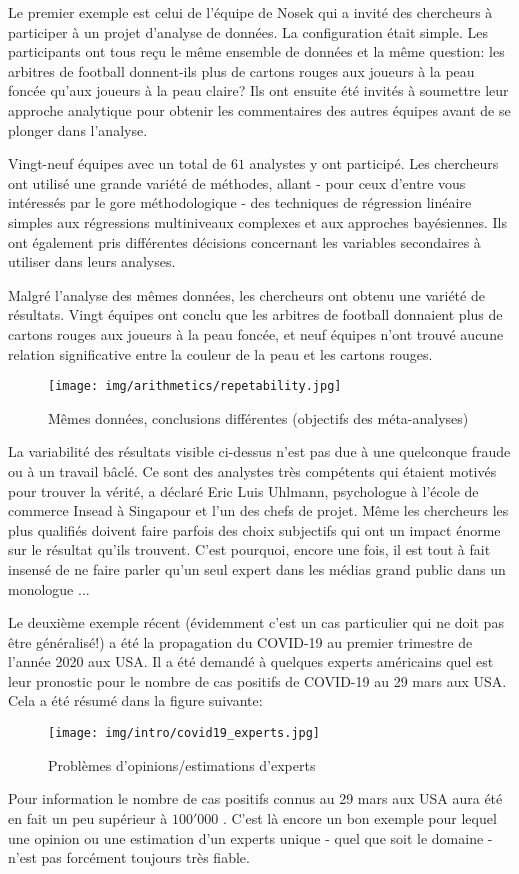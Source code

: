 	Le premier exemple est celui de l'équipe de Nosek qui a invité des chercheurs à participer à un projet d'analyse de données. La configuration était simple. Les participants ont tous reçu le même ensemble de données et la même question: les arbitres de football donnent-ils plus de cartons rouges aux joueurs à la peau foncée qu'aux joueurs à la peau claire? Ils ont ensuite été invités à soumettre leur approche analytique pour obtenir les commentaires des autres équipes avant de se plonger dans l'analyse.
	
	Vingt-neuf équipes avec un total de $61$ analystes y ont participé. Les chercheurs ont utilisé une grande variété de méthodes, allant - pour ceux d'entre vous intéressés par le gore méthodologique - des techniques de régression linéaire simples aux régressions multiniveaux complexes et aux approches bayésiennes. Ils ont également pris différentes décisions concernant les variables secondaires à utiliser dans leurs analyses.

	Malgré l'analyse des mêmes données, les chercheurs ont obtenu une variété de résultats. Vingt équipes ont conclu que les arbitres de football donnaient plus de cartons rouges aux joueurs à la peau foncée, et neuf équipes n'ont trouvé aucune relation significative entre la couleur de la peau et les cartons rouges.
	\begin{figure}[H]
		\centering
		\texttt{[image: img/arithmetics/repetability.jpg]}
		\caption{Mêmes données, conclusions différentes (objectifs des méta-analyses)}
	\end{figure}
	La variabilité des résultats visible ci-dessus n'est pas due à une quelconque fraude ou à un travail bâclé. Ce sont des analystes très compétents qui étaient motivés pour trouver la vérité, a déclaré Eric Luis Uhlmann, psychologue à l'école de commerce Insead à Singapour et l'un des chefs de projet. Même les chercheurs les plus qualifiés doivent faire parfois des choix subjectifs qui ont un impact énorme sur le résultat qu'ils trouvent. C'est pourquoi, encore une fois, il est tout à fait insensé de ne faire parler qu'un seul expert dans les médias grand public dans un monologue ...
	
	Le deuxième exemple récent (évidemment c'est un cas particulier qui ne doit pas être généralisé!) a été la propagation du COVID-19 au premier trimestre de l'année 2020 aux USA. Il a été demandé à quelques experts américains quel est leur pronostic pour le nombre de cas positifs de COVID-19 au 29 mars aux USA. Cela a été résumé dans la figure suivante:
	\begin{figure}[H]
		\centering
		\texttt{[image: img/intro/covid19\_experts.jpg]}
		\caption{Problèmes d'opinions/estimations d'experts}
	\end{figure}
	Pour information le nombre de cas positifs connus au 29 mars aux USA aura été en fait un peu supérieur à $100'000$ . C'est là encore un bon exemple pour lequel une opinion ou une estimation d'un experts unique - quel que soit le domaine - n'est pas forcément toujours très fiable.
	
